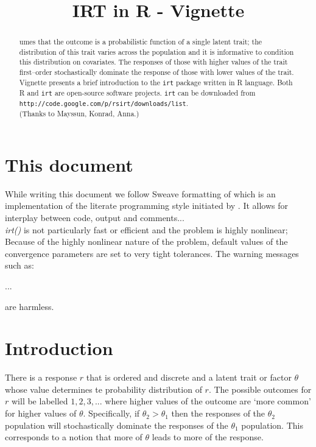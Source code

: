\documentclass{amsart}
\title{IRT in R - Vignette}
\author{}
\newcommand{\Rpackage}[1]{{\texttt{#1}}}
\newcommand{\R}{{\normalfont\textsf{R }}{}}
\begin{document}

\begin{abstract}
	umes that the outcome is a probabilistic function of a single latent
	trait; the distribution of this trait varies across the population
	and it is informative to condition this distribution on covariates.
	The responses of those with higher values of the trait first--order
	stochastically dominate the response of those with lower values of
	the trait.\\
Vignette presents a brief introduction to the \Rpackage{irt} package written in \R language.
Both \R and \Rpackage{irt} are open-source software projects.
\Rpackage{irt} can be downloaded from \texttt{http://code.google.com/p/rsirt/downloads/list}.\\
(Thanks to Mayssun, Konrad, Anna.)
\end{abstract}

\maketitle

\pagestyle{myheadings}
\markboth{\sc \Rpackage{irt} in \R}{\sc}

\section{This document }
While writing this document we follow Sweave formatting of  which is an implementation 
of the literate programming style initiated by . It allows for interplay between code, output and comments...\\

\emph{irt()} is not particularly fast or efficient and the problem
is highly nonlinear; Because of the highly nonlinear nature of the problem, default values
of the convergence parameters are set to very tight tolerances. The
warning messages such as: 

...

are harmless.

\section{Introduction}
There is a response $r$ that is ordered and discrete and a latent
trait or factor $\theta$ whose value determines te probability distribution
of $r$. The possible outcomes for $r$ will be labelled $1,2,3,...$
where higher values of the outcome are `more common' for higher values
of $\theta.$ Specifically, if $\theta_{2}>\theta_{1}$ then the responses
of the $\theta_{2}$ population will stochastically dominate the responses
of the $\theta_{1}$ population. This corresponds to a notion that
more of $\theta$ leads to more of the response.
\end{document}

